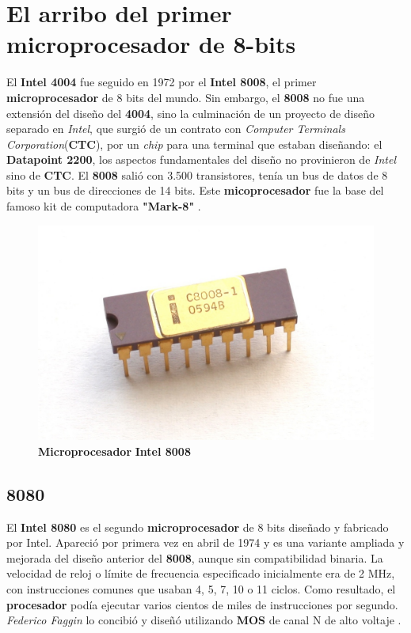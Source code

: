 \section{El arribo del primer microprocesador de 8-bits}
El \textbf{Intel 4004} fue seguido en 1972 por el \textbf{Intel 8008}, el primer \textbf{microprocesador} de 8 bits del mundo.
Sin embargo, el \textbf{8008} no fue una extensión del diseño del \textbf{4004}, sino la culminación de un proyecto de diseño separado
en \emph{Intel}, que surgió de un contrato con \emph{Computer Terminals Corporation}(\textbf{CTC}), por un \emph{chip} para
una terminal que estaban diseñando: el \textbf{Datapoint 2200}, los aspectos fundamentales del diseño no provinieron de \emph{Intel}
sino de \textbf{CTC}. El \textbf{8008} salió con 3.500 transistores, tenía un bus de datos de 8 bits y un bus de direcciones de 14 bits. Este
\textbf{micoprocesador} fue la base del famoso kit de computadora \textbf{"Mark-8"} .

\begin{figure}[htb]
	\centering
	\includegraphics[scale = 0.15]{Graphics/Intel_C8008-1.jpg}
	\caption{\textbf{Microprocesador}  \textbf{Intel 8008}}
	\label{fig:13}
\end{figure}

\subsection{8080}
El  \textbf{Intel 8080} es el segundo \textbf{microprocesador} de 8 bits diseñado y fabricado por Intel. Apareció por primera vez en abril de
1974 y es una variante ampliada y mejorada del diseño anterior del \textbf{8008}, aunque sin compatibilidad binaria. La velocidad de reloj o
límite de frecuencia especificado inicialmente era de 2 MHz, con instrucciones comunes que usaban 4, 5, 7, 10 o 11 ciclos. Como resultado,
el \textbf{procesador} podía ejecutar varios cientos de miles de instrucciones por segundo. \emph{Federico Faggin} lo concibió y diseñó 
utilizando \textbf{MOS} de canal N de alto voltaje .

